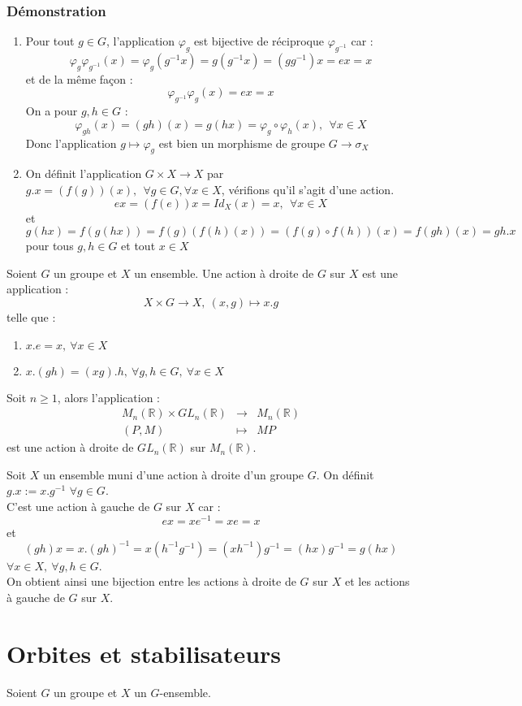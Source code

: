 \documentclass[a4paper, oneside]{report}
\theoremstyle{break}
\newcommand{\x}{\times}
\newcommand{\R}{\mathbb{R}}
\newcommand{\dem}{\subsubsection{Démonstration}}
\begin{document}
\dem
\begin{enumerate}
\item Pour tout $g\in G$, l'application $\varphi_g$ est bijective de réciproque $\varphi_{g^{-1}}$ car :
$$\varphi_g\varphi_{g^{-1}}(x)=\varphi_g(g^{-1}x)=g(g^{-1}x)=(gg^{-1})x=ex=x$$
et de la même façon :
$$\varphi_{g^{-1}}\varphi_g(x)=ex=x$$
On a pour $g,h\in G$ :
$$\varphi_{gh}(x)=(gh)(x)=g(hx)=\varphi_g\circ \varphi_h(x),~~\forall x\in X$$
Donc l'application $g\mapsto \varphi_g$ est bien un morphisme de groupe $G\rightarrow \sigma_X$
\item On définit l'application $G\x X \rightarrow X$ par $g.x = (f(g))(x),~~\forall g\in G,\forall x\in X$, vérifions qu'il s'agit d'une action.\\
$$ex=(f(e))x=Id_X(x)=x,~~\forall x\in X$$
et 
$$g(hx)=f(g(hx))=f(g)(f(h)(x))=(f(g)\circ f(h) )(x)=f(gh)(x)=gh.x$$
pour tous $g,h\in G$ et tout $x\in X$
\end{enumerate}

Soient $G$ un groupe et $X$ un ensemble. Une action à droite de $G$ sur $X$ est une application :
$$X\x G\rightarrow X,~(x,g)\mapsto x.g$$
telle que :
\begin{enumerate}
\item $x.e=x,~\forall x\in X$
\item $x.(gh)=(xg).h,~\forall g,h\in G,~\forall x\in X$
\end{enumerate}

\exem
Soit $n\geq 1$, alors l'application :
$$\begin{array}{lll}
M_n(\R)\x GL_n(\R)&\rightarrow & M_n(\R)\\
(P,M)&\mapsto & MP
\end{array}$$
est une action à droite de $GL_n(\R)$ sur $M_n(\R)$.

\remar
Soit $X$ un ensemble muni d'une action à droite d'un groupe $G$. On définit $g.x := x.g^{-1}$ $\forall g\in G$.\\
C'est une action à gauche de $G$ sur $X$ car :
$$ex=xe^{-1}=xe=x$$
et 
$$(gh)x=x.(gh)^{-1}=x(h^{-1}g^{-1})=(xh^{-1})g^{-1}=(hx)g^{-1}=g(hx)$$
$\forall x\in X, ~\forall g,h\in G$.\\
On obtient ainsi une bijection entre les actions à droite de $G$ sur $X$ et les actions à gauche de $G$ sur $X$.

\section{Orbites et stabilisateurs}
Soient $G$ un groupe et $X$ un $G$-ensemble.
\end{document}
